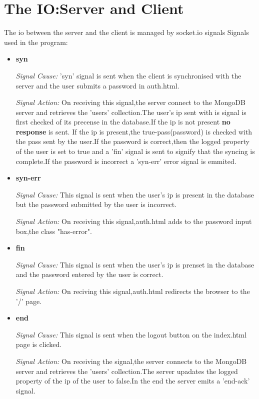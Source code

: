 \documentclass[a4paper,10pt]{article}
\begin{document}
\section{The IO:Server and Client}
The io between the server and the client is managed by socket.io signals
Signals used in the program:
\begin{itemize}
 
\item \textbf{syn}

\textit{Signal Cause:}
'syn' signal is sent when the client is synchronised with the server and the 
user submits a password in auth.html.

\textit{Signal Action:}
    On receiving this signal,the server connect to the MongoDB server
and retrieves the 'users' collection.The user's ip sent with is signal 
is first checked of its precense in the database.If the ip is not present \textbf{no response} is sent.
    If the ip is present,the true-pass(password) is checked with the pass sent
by the user.If the password is correct,then the logged property of the user is set
to true and a 'fin' signal is sent to signify that the syncing is complete.If the 
password is incorrect a 'syn-err' error signal is emmited.


\item \textbf{syn-err}

\textit{Signal Cause:}
    This signal is sent when the user's ip is present in the database but the password
submitted by the user is incorrect.
    
\textit{Signal Action:}
    On receiving this signal,auth.html adds to the password input box,the class "has-error".


\item \textbf{fin}

\textit{Signal Cause:}
    This signal is sent when the user's ip is prenset in the database and the password
entered by the user is correct.

\textit{Signal Action:}
    On reciving this signal,auth.html redirects the browser to the '/' page.


\item \textbf{end}

\textit{Signal Cause:}
    This signal is sent when the logout button on the index.html page is clicked.

\textit{Signal Action:}
    On receiving the signal,the server connects to the MongoDB server and retrieves
the 'users' collection.The server upadates the logged property of the ip of the user
to false.In the end the server emits a 'end-ack' signal.


\end{itemize}
\end{document}
